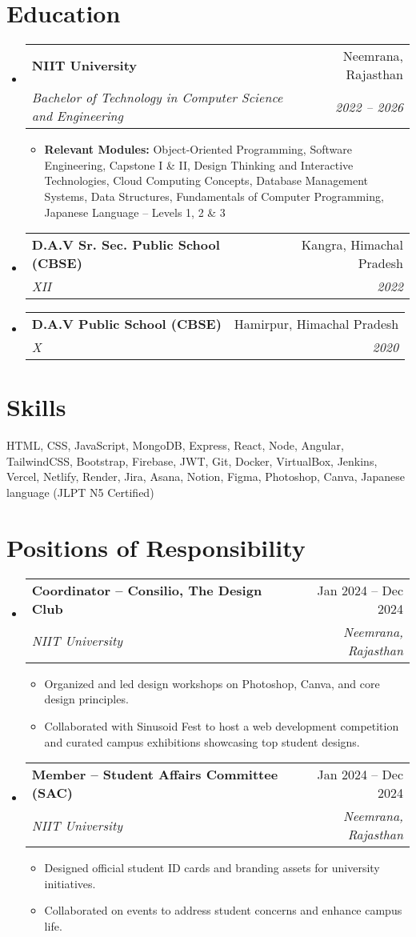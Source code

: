 \documentclass[letterpaper,11pt]{article}
\makeatletter
\newcommand{\resumeItem}[1]{
  \item\small{
    {#1 \vspace{-2pt}}
  }
}
\newcommand{\resumeSubheading}[4]{
  \vspace{-2pt}\item
    \begin{tabular*}{0.97\textwidth}[t]{l@{\extracolsep{\fill}}r}
      \textbf{#1} & #2 \\
      \textit{\small#3} & \textit{\small #4} \\
    \end{tabular*}\vspace{-7pt}
}
\newcommand{\resumeItemListStart}{\begin{itemize}}
\newcommand{\resumeItemListEnd}{\end{itemize}\vspace{-5pt}}
\newcommand{\resumeSubHeadingListStart}{\begin{itemize}[leftmargin=0.15in, label={}]}
\newcommand{\resumeSubHeadingListEnd}{\end{itemize}}
\makeatother
\begin{document}
\section{Education}
\resumeSubHeadingListStart
    \resumeSubheading
      {NIIT University}{Neemrana, Rajasthan}
      {Bachelor of Technology in Computer Science and Engineering}{2022 -- 2026}
    \resumeItemListStart
      \resumeItem{\textbf{Relevant Modules:} Object-Oriented Programming, Software Engineering, Capstone I \& II, Design Thinking and Interactive Technologies, Cloud Computing Concepts, Database Management Systems, Data Structures, Fundamentals of Computer Programming, Japanese Language – Levels 1, 2 \& 3}
    \resumeItemListEnd

    \resumeSubheading
      {D.A.V Sr. Sec. Public School (CBSE)}{Kangra, Himachal Pradesh}
      {XII}{2022}

    \resumeSubheading
      {D.A.V Public School (CBSE)}{Hamirpur, Himachal Pradesh}
      {X}{2020}
\resumeSubHeadingListEnd

\section{Skills}
\begin{itemize}[leftmargin=0.15in, label={}]
  \small{
    \item{
      HTML, CSS, JavaScript, MongoDB, Express, React, Node, Angular, TailwindCSS, Bootstrap, Firebase, JWT, Git, Docker, VirtualBox, Jenkins, Vercel, Netlify, Render, Jira, Asana, Notion, Figma, Photoshop, Canva, Japanese language (JLPT N5 Certified) 
    }
  }
\end{itemize}

\section{Positions of Responsibility}
\resumeSubHeadingListStart
  \resumeSubheading
    {Coordinator – Consilio, The Design Club}{Jan 2024 -- Dec 2024}
    {NIIT University}{Neemrana, Rajasthan}
  \resumeItemListStart
    \resumeItem{Organized and led design workshops on Photoshop, Canva, and core design principles.}
    \resumeItem{Collaborated with Sinusoid Fest to host a web development competition and curated campus exhibitions showcasing top student designs.}
  \resumeItemListEnd

  \resumeSubheading
    {Member – Student Affairs Committee (SAC)}{Jan 2024 -- Dec 2024}
    {NIIT University}{Neemrana, Rajasthan}
  \resumeItemListStart
    \resumeItem{Designed official student ID cards and branding assets for university initiatives.}
    \resumeItem{Collaborated on events to address student concerns and enhance campus life.}
  \resumeItemListEnd
\resumeSubHeadingListEnd
\end{document}
